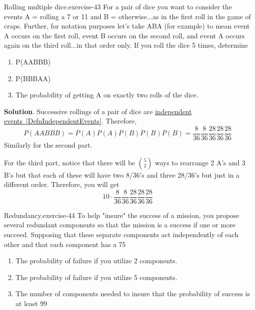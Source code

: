 \documentclass[10pt,]{book}
\numberwithin{equation}{section}
\begin{document}
%
\par
\hypertarget{p-637}{}%
\begin{inlineexercise}{Rolling multiple dice.}{exercise-43}%
\hypertarget{p-638}{}%
For a pair of dice you want to consider the events A = {rolling a 7 or 11} and B = {otherwise}...as in the first roll in the game of craps.  Further, for notation purposes let's take ABA (for example) to mean event A occurs on the first roll, event B occurs on the second roll, and event A occurs again on the third roll...in that order only. If you roll the dice 5 times, determine \leavevmode%
\begin{enumerate}
\item\hypertarget{li-185}{}P(AABBB)%
\item\hypertarget{li-186}{}P(BBBAA)%
\item\hypertarget{li-187}{}The probability of getting A on exactly two rolls of the dice.%
\end{enumerate}
%
\par\smallskip%
\noindent\textbf{Solution}.\hypertarget{solution-20}{}\quad%
\hypertarget{p-639}{}%
Successive rollings of a pair of dice are \hyperref[DefnIndependentEvents]{independent events~\ref{DefnIndependentEvents}}. Therefore,%
\begin{equation*}
P(AABBB) = P(A)P(A)P(B)P(B)P(B) = \frac{8}{36} \frac{8}{36} \frac{28}{36} \frac{28}{36} \frac{28}{36}
\end{equation*}
Similarly for the second part.%
\par
\hypertarget{p-640}{}%
For the third part, notice that there will be \(\binom{5}{2}\) ways to rearrange 2 A's and 3 B's but that each of these will have two 8/36's and three 28/36's but just in a different order. Therefore, you will get%
\begin{equation*}
10 \cdot \frac{8}{36} \frac{8}{36} \frac{28}{36} \frac{28}{36} \frac{28}{36}
\end{equation*}
%
\end{inlineexercise}
%
\par
\hypertarget{p-641}{}%
\begin{inlineexercise}{Redundancy.}{exercise-44}%
\hypertarget{p-642}{}%
To help "insure" the success of a mission, you propose several redundant components so that the mission is a success if one or more succeed. Supposing that these separate components act independently of each other and that each component has a 75%
\begin{enumerate}
\item\hypertarget{li-188}{}The probability of failure if you utilize 2 components.%
\item\hypertarget{li-189}{}The probability of failure if you utilize 5 components.%
\item\hypertarget{li-190}{}The number of components needed to insure that the probability of success is at least 99%
\end{enumerate}
%
\end{inlineexercise}
\end{document}
